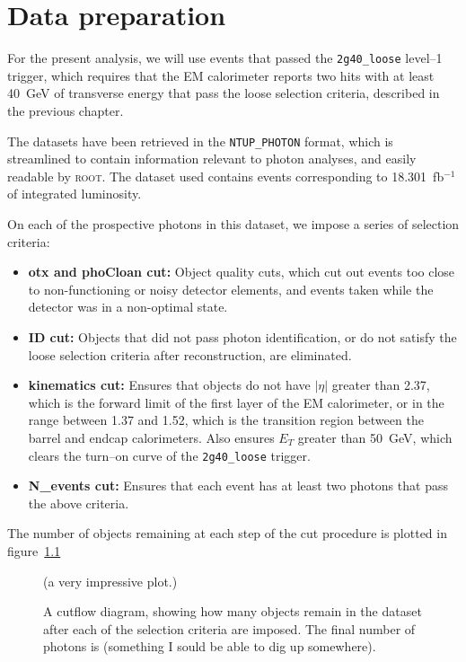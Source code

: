 \chapter{Data preparation}

For the present analysis, we will use events that passed the \texttt{2g40\_loose} level--1 trigger, which requires that the EM calorimeter reports two hits with at least 40~GeV of transverse energy that pass the loose selection criteria, described in the previous chapter.

The datasets have been retrieved in the \texttt{NTUP\_PHOTON} format, which is streamlined to contain information relevant to photon analyses, and easily readable by \textsc{root}. The dataset used contains events corresponding to 18.301~fb$^{-1}$ of integrated luminosity.

On each of the prospective photons in this dataset, we impose a series of selection criteria:

\begin{itemize}
\item \textbf{otx and phoCloan cut:} Object quality cuts, which cut out events too close to non-functioning or noisy detector elements, and events taken while the detector was in a non-optimal state.
\item \textbf{ID cut:} Objects that did not pass photon identification, or do not satisfy the loose selection criteria after reconstruction, are eliminated.
\item \textbf{kinematics cut:} Ensures that objects do not have $|\eta|$ greater than 2.37, which is the forward limit of the first layer of the EM calorimeter, or in the range between 1.37 and 1.52, which is the transition region between the barrel and endcap calorimeters. Also ensures $E_T$ greater than 50~GeV, which clears the turn--on curve of the \texttt{2g40\_loose} trigger.
\item \textbf{N\_events cut:} Ensures that each event has at least two photons that pass the above criteria.

\end{itemize}

The number of objects remaining at each step of the cut procedure is plotted in figure~\ref{cutflow}

\begin{figure}[htp]
\begin{minipage}[b]{.69\textwidth}
\hspace{-1em}%
\centering (a very impressive plot.)
\end{minipage}\hfill\begin{minipage}[b]{.3\textwidth}
\caption{A cutflow diagram, showing how many objects remain in the dataset after each of the selection criteria are imposed. The final number of photons is (something I sould be able to dig up somewhere).
\label{cutflow}}
\end{minipage}
\end{figure}

